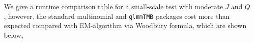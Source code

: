 
We give a runtime comparison table for a small-scale test with moderate $J$ and $Q$, however, the standard multinomial and \texttt{glmmTMB} packages cost more than expected compared with EM-algorithm via Woodbury formula, which are shown below,

